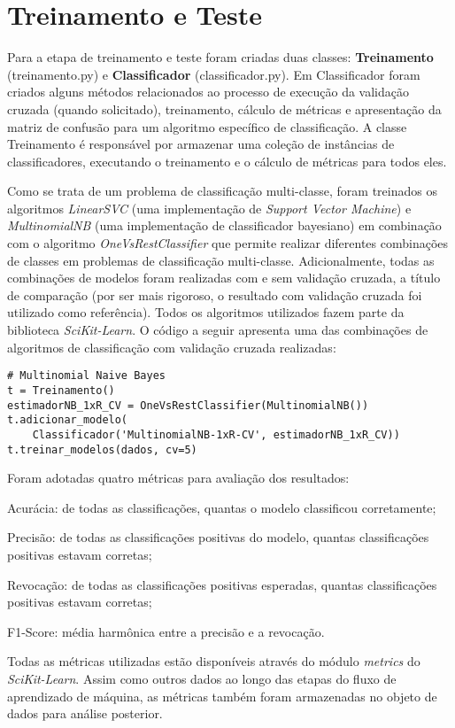 \section{Treinamento e Teste}

Para a etapa de treinamento e teste foram criadas duas classes: \textbf{Treinamento} (treinamento.py) e \textbf{Classificador} (classificador.py). Em Classificador foram criados alguns  métodos relacionados ao processo de execução da validação cruzada (quando solicitado), treinamento, cálculo de métricas e apresentação da matriz de confusão para um algoritmo específico de classificação. A classe Treinamento é responsável por armazenar uma coleção de instâncias de classificadores, executando o treinamento e o cálculo de métricas para todos eles.

Como se trata de um problema de classificação multi-classe, foram treinados os algoritmos \textit{LinearSVC} (uma implementação de \textit{Support Vector Machine}) e \textit{MultinomialNB} (uma implementação de classificador bayesiano) em combinação com o algoritmo \textit{OneVsRestClassifier} que permite realizar diferentes combinações de classes em problemas de classificação multi-classe. Adicionalmente, todas as combinações de modelos foram realizadas com e sem validação cruzada, a título de comparação (por ser mais rigoroso, o resultado com validação cruzada foi utilizado como referência). Todos os algoritmos utilizados fazem parte da biblioteca \textit{SciKit-Learn}. O código a seguir apresenta uma das combinações de algoritmos de classificação com validação cruzada realizadas:

\begin{lstlisting}
# Multinomial Naive Bayes 
t = Treinamento()
estimadorNB_1xR_CV = OneVsRestClassifier(MultinomialNB())
t.adicionar_modelo(
	Classificador('MultinomialNB-1xR-CV', estimadorNB_1xR_CV))
t.treinar_modelos(dados, cv=5)
\end{lstlisting}

Foram adotadas quatro métricas para avaliação dos resultados: 
\begin{alineas}
	\item Acurácia: de todas as classificações, quantas o modelo classificou corretamente;
	\item Precisão: de todas as classificações positivas do modelo, quantas classificações positivas estavam corretas;
	\item Revocação: de todas as classificações positivas esperadas, quantas classificações positivas estavam corretas;
	\item  F1-Score: média harmônica entre a precisão e a revocação.
\end{alineas}

Todas as métricas utilizadas estão disponíveis através do módulo \textit{metrics} do \textit{SciKit-Learn}. Assim como outros dados ao longo das etapas do fluxo de aprendizado de máquina, as métricas também foram armazenadas no objeto de dados para análise posterior. 